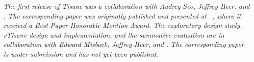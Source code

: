 

\textit{The first release of Tisane was a collaboration with Audrey Seo, Jeffrey
Heer, and \reneJust. The corresponding paper was originally published and presented at
~\cite{jun2022tisane}, where it received a \textit{Best Paper Honorable
Mention Award}. The exploratory design study, rTisane design and implementation, and the
summative evaluation are in collaboration with Edward Misback, Jeffrey Heer, and
\reneJust. The corresponding paper is under submission and has not yet been published.}
